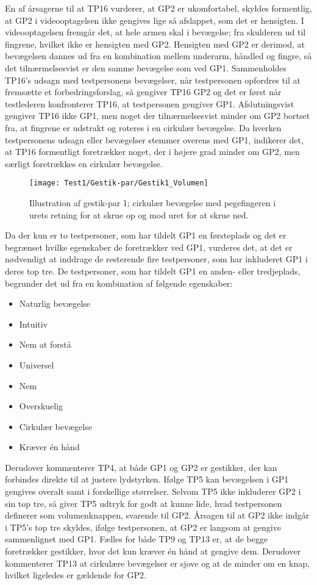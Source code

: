 En af årsagerne til at TP16 vurderer, at GP2 er ukomfortabel, skyldes formentlig, at GP2 i videooptagelsen ikke gengives lige så afslappet, som det er hensigten. I videooptagelsen fremgår det, at hele armen skal i bevægelse; fra skulderen ud til fingrene, hvilket ikke er hensigten med GP2. Hensigten med GP2 er derimod, at bevægelsen dannes ud fra en kombination mellem underarm, håndled og fingre, så det tilnærmelsesvist er den samme bevægelse som ved GP1. Sammenholdes TP16's udsagn med testpersonens bevægelser, når testpersonen opfordres til at fremsætte et forbedringsforslag, så gengiver TP16 GP2 og det er først når testlederen konfronterer TP16, at testpersonen gengiver GP1. Afslutningsvist gengiver TP16 ikke GP1, men noget der tilnærmelsesvist minder om GP2 bortset fra, at fingrene er udstrakt og roteres i en cirkulær bevægelse. Da hverken testpersonens udsagn eller bevægelser stemmer overens med GP1, indikerer det, at TP16 formentligt foretrækker noget, der i højere grad minder om GP2, men særligt foretrækkes en cirkulær bevægelse.
%
\begin{figure}[H]
	\centering
	\texttt{[image: Test1/Gestik-par/Gestik1\_Volumen]}
	\caption{Illustration af gestik-par 1; cirkulær bevægelse med pegefingeren i urets retning for at skrue op og mod uret for at skrue ned.}
	\label{fig:GestikPar1Volumen}
\end{figure}
\noindent
%
Da der kun er to testpersoner, som har tildelt GP1 en førsteplads og det er begrænset hvilke egenskaber de foretrækker ved GP1, vurderes det, at det er nødvendigt at inddrage de resterende fire testpersoner, som har inkluderet GP1 i deres top tre. De testpersoner, som har tildelt GP1 en anden- eller tredjeplads, begrunder det ud fra en kombination af følgende egenskaber: 
%
\begin{multicols}{3}
    \begin{itemize}
        \item Naturlig bevægelse
        \item Intuitiv 
        \item Nem at forstå
        \item Universel
        \item Nem
        \item Overskuelig
        \item Cirkulær bevægelse
        \item Kræver én hånd
\end{itemize}
\end{multicols}
\noindent
%
Derudover kommenterer TP4, at både GP1 og GP2 er gestikker, der kan forbindes direkte til at justere lydstyrken. Ifølge TP5 kan bevægelsen i GP1 gengives overalt samt i forskellige størrelser. Selvom TP5 ikke inkluderer GP2 i sin top tre, så giver TP5 udtryk for godt at kunne lide, hvad testpersonen definerer som volumenknappen, svarende til GP2. Årsagen til at GP2 ikke indgår i TP5's top tre skyldes, ifølge testpersonen, at GP2 er langsom at gengive sammenlignet med GP1. Fælles for både TP9 og TP13 er, at de begge foretrækker gestikker, hvor det kun kræver én hånd at gengive dem. Derudover kommenterer TP13 at cirkulære bevægelser er sjove og at de minder om en knap, hvilket ligeledes er gældende for GP2.      
%
